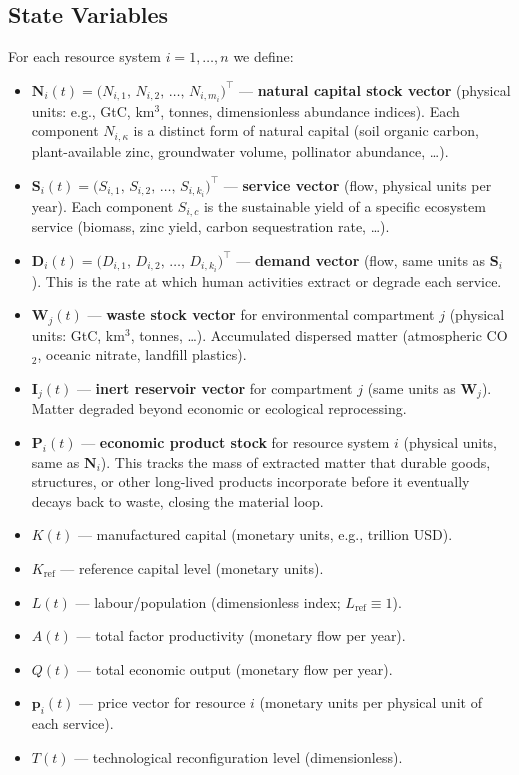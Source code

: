 \documentclass[twocolumn,10pt]{article}
\begin{document}
\subsection{State Variables}
For each resource system \(i = 1,\dots,n\) we define:
\begin{itemize}
\item \(\mathbf{N}_i(t) = \bigl(N_{i,1},\, N_{i,2},\, \dots,\, N_{i,m_i}\bigr)^\top\) --- \textbf{natural capital
      stock vector} (physical units: e.g., GtC, km\(^3\), tonnes, dimensionless abundance indices). Each
      component \(N_{i,\kappa}\) is a distinct form of natural capital (soil organic carbon, plant-available zinc,
      groundwater volume, pollinator abundance, \dots).
\item \(\mathbf{S}_i(t) = \bigl(S_{i,1},\, S_{i,2},\, \dots,\, S_{i,k_i}\bigr)^\top\) --- \textbf{service vector}
      (flow, physical units per year). Each component \(S_{i,c}\) is the sustainable yield of a specific
      ecosystem service (biomass, zinc yield, carbon sequestration rate, \dots).
\item \(\mathbf{D}_i(t) = \bigl(D_{i,1},\, D_{i,2},\, \dots,\, D_{i,k_i}\bigr)^\top\) --- \textbf{demand vector}
      (flow, same units as \(\mathbf{S}_i\)). This is the rate at which human activities extract or degrade
      each service.
\item \(\mathbf{W}_j(t)\) --- \textbf{waste stock vector} for environmental compartment \(j\) (physical units:
      GtC, km\(^3\), tonnes, \dots). Accumulated dispersed matter (atmospheric CO\(_2\), oceanic nitrate,
      landfill plastics).
\item \(\mathbf{I}_j(t)\) --- \textbf{inert reservoir vector} for compartment \(j\) (same units as \(\mathbf{W}_j\)).
      Matter degraded beyond economic or ecological reprocessing.
\item \(\mathbf{P}_{i}(t)\) --- \textbf{economic product stock} for resource system \(i\) (physical units, same as \(\mathbf{N}_i\)). This tracks the mass of extracted matter that durable goods, structures, or other long-lived products incorporate before it eventually decays back to waste, closing the material loop.
\item \(K(t)\) --- manufactured capital (monetary units, e.g., trillion USD).
\item \(K_{\text{ref}}\) --- reference capital level (monetary units).
\item \(L(t)\) --- labour/population (dimensionless index; \(L_{\text{ref}}\equiv 1\)).
\item \(A(t)\) --- total factor productivity (monetary flow per year).
\item \(Q(t)\) --- total economic output (monetary flow per year).
\item \(\mathbf{p}_i(t)\) --- price vector for resource \(i\) (monetary units per physical unit of each service).
\item \(T(t)\) --- technological reconfiguration level (dimensionless).
\end{itemize}
\end{document}
